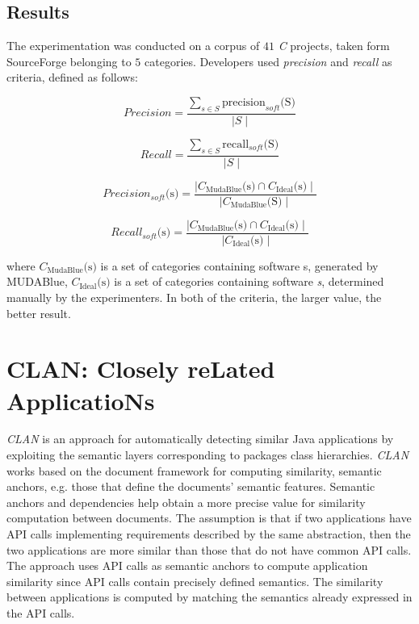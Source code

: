 \subsection{Results}
The experimentation was conducted on a corpus of $41$ \emph{C} projects, taken form SourceForge belonging to $5$ categories.
Developers used \emph{precision} and \emph{recall} as criteria, defined as follows:

\begin{equation}
Precision = \frac{\sum_{s\in S}\text{precision}_{soft}\text{(S)}}  {\mid S \mid}
\end{equation}

\begin{equation}
Recall = \frac{\sum_{s\in S}\text{recall}_{soft}\text{(S)}}  {\mid S \mid}
\end{equation}

\begin{equation}
Precision_{soft}\text{(s)} = \frac{\mid C_\text{MudaBlue}\text{(s)} \cap C_\text{Ideal}\text{(s)} \mid}  {\mid C_\text{MudaBlue}\text{(S)} \mid}
\end{equation}

\begin{equation}
Recall_{soft}\text{(s)} = \frac{\mid C_\text{MudaBlue}\text{(s)} \cap C_\text{Ideal}\text{(s)} \mid}  {\mid C_\text{Ideal}\text{(s)} \mid}
\end{equation}

where $C_\text{MudaBlue}\text{(s)}$ is a set of categories containing software s, generated by MUDABlue, $C_\text{Ideal}\text{(s)}$ is a set of categories containing software \emph{s}, determined manually by the experimenters. In both of the criteria, the larger value,
the better result.




\section{CLAN:  Closely reLated ApplicatioNs}

\textit{CLAN} \cite{McMillan:2012:DSS:2337223.2337267} is an approach for automatically detecting similar Java applications by exploiting the semantic layers corresponding to packages class hierarchies. \textit{CLAN} works based on the document framework for computing similarity, semantic anchors, e.g. those that define the documents' semantic features. Semantic anchors and dependencies help obtain a more precise value for similarity computation between documents. The assumption is that if two applications have API calls implementing requirements described by the same abstraction, then the two applications are more similar than those that do not have common API calls. The approach uses API calls as semantic anchors to compute application similarity since API calls contain precisely defined semantics. The similarity between applications is computed by matching the semantics already expressed in the API calls.


